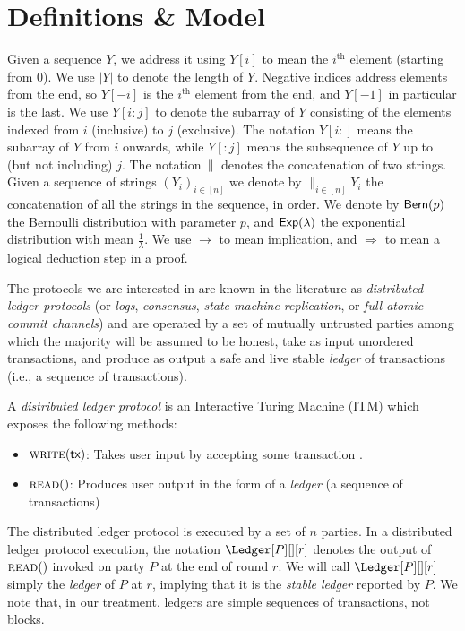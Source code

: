 \section{Definitions \& Model}\label{sec:model}

\noindent
\myparagraph[Notation]
Given a sequence $Y$, we address it using $Y[i]$ to mean the $i^\text{th}$ element (starting from $0$).
We use $|Y|$ to denote the length of $Y$.
Negative indices address elements from the end, so $Y[-i]$ is the $i^\text{th}$ element from
the end, and $Y[-1]$ in particular is the last. We use $Y[i{:}j]$ to denote the subarray of $Y$
consisting of the elements indexed from $i$ (inclusive) to $j$ (exclusive). The notation $Y[i{:}]$ means the
subarray of $Y$ from $i$ onwards, while $Y[{:}j]$ means the subsequence of $Y$ up to (but not including) $j$.
The notation $\,\|\,$ denotes the concatenation of two strings.
Given a sequence of strings $(Y_i)_{i \in [n]}$ we denote by $\big\lVert_{i \in [n]} Y_i$ the concatenation
of all the strings in the sequence, in order. We denote by $\textsf{Bern}(p)$ the Bernoulli distribution with parameter $p$,
and $\textsf{Exp}(\lambda)$ the exponential distribution with mean $\frac{1}{\lambda}$.
We use $\rightarrow$ to mean implication, and $\Rightarrow$ to mean a logical
deduction step in a proof.

The protocols we are interested in are known in the literature as \emph{distributed ledger protocols}
(or \emph{logs}, \emph{consensus}, \emph{state machine replication}, or \emph{full atomic commit channels})
and are operated by a set of mutually untrusted parties among which the majority will be assumed to be honest,
take as input unordered transactions, and produce as output a safe and live stable \emph{ledger} of transactions (i.e.,
a sequence of transactions).

\begin{definition}
  A \emph{distributed ledger protocol} is an Interactive Turing Machine (ITM)
  which exposes the following methods:

  \begin{itemize}
    \item $\textsc{write}(\textsf{tx})$:
      Takes user input by accepting some transaction \tx.
    \item $\textsc{read}()$:
      Produces user output in the form of a \emph{ledger} (a sequence of transactions)
  \end{itemize}
\end{definition}

The distributed ledger protocol is executed by a set of $n$ parties.
In a distributed ledger protocol execution, the notation
$\Ledger[P][][r]$ denotes the output of $\textsc{read}()$
invoked on party $P$ at the end of round $r$.
We will call $\Ledger[P][][r]$ simply the \emph{ledger} of $P$ at $r$,
implying that it is the \emph{stable ledger} reported by $P$.
We note that, in our treatment, ledgers are simple sequences of transactions,
not blocks.

